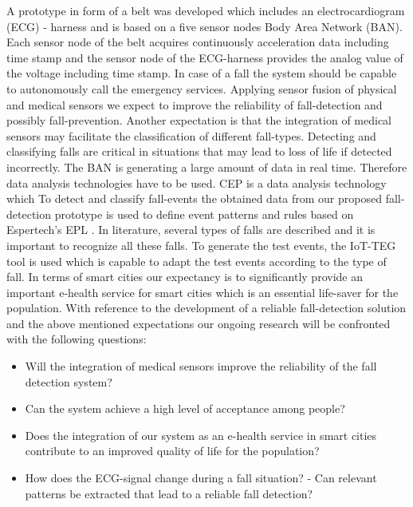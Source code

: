 \documentclass[review]{elsarticle}
\begin{document}
A prototype in form of a belt was developed which includes an electrocardiogram (ECG) - harness and is based on a five sensor nodes Body Area Network (BAN). Each sensor node of the belt acquires continuously acceleration data including time stamp and the sensor node of the ECG-harness provides the analog value of the voltage including time stamp. In case of a fall the system should be capable to autonomously call the emergency services. Applying sensor fusion of physical and medical sensors we expect to improve the reliability of fall-detection and possibly fall-prevention. Another expectation is that the integration of medical sensors may facilitate the classification of different fall-types. Detecting and classifying falls are critical in situations that may lead to loss of life if detected incorrectly. The BAN is generating a large amount of data in real time. Therefore data analysis technologies have to be used. CEP \cite{Esper:2016} is a data analysis technology which   To detect and classify fall-events the obtained data from our proposed fall-detection prototype is used to define event patterns and rules based on Espertech's EPL \cite{Esper:2016}. In literature, several types of falls are described and it is important to recognize all these falls. To generate the test events, the IoT-TEG tool is used which is capable to adapt the test events according to the type of fall.
In terms of smart cities our expectancy is to significantly provide an important e-health service for smart cities which is an essential life-saver for the population. With reference to the development of a reliable fall-detection solution and the above mentioned expectations our ongoing research will be confronted with the following questions:
\begin{itemize}
	\item Will the integration of medical sensors improve the reliability of the fall detection system?
	\item Can the system achieve a high level of acceptance among people?
	\item Does the integration of our system as an e-health service in smart cities contribute to an improved quality of life for the population?
	\item How does the ECG-signal change during a fall situation? - Can relevant patterns be extracted that lead to a reliable fall detection?
	
\end{itemize}
\end{document}
